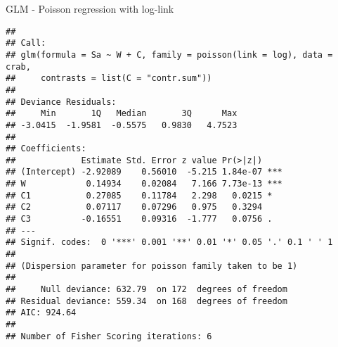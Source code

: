 \documentclass[ignorenonframetext,]{beamer}
\newenvironment{Shaded}{\begin{snugshade}}{\end{snugshade}}
\newcommand{\KeywordTok}[1]{\textcolor[rgb]{0.13,0.29,0.53}{\textbf{#1}}}
\newcommand{\DataTypeTok}[1]{\textcolor[rgb]{0.13,0.29,0.53}{#1}}
\newcommand{\DecValTok}[1]{\textcolor[rgb]{0.00,0.00,0.81}{#1}}
\newcommand{\StringTok}[1]{\textcolor[rgb]{0.31,0.60,0.02}{#1}}
\newcommand{\CommentTok}[1]{\textcolor[rgb]{0.56,0.35,0.01}{\textit{#1}}}
\newcommand{\OperatorTok}[1]{\textcolor[rgb]{0.81,0.36,0.00}{\textbf{#1}}}
\newcommand{\NormalTok}[1]{#1}
\begin{document}
\begin{frame}[fragile]

\begin{block}{GLM - Poisson regression with log-link}

\begin{Shaded}
\end{Shaded}

\begin{verbatim}
## 
## Call:
## glm(formula = Sa ~ W + C, family = poisson(link = log), data = crab, 
##     contrasts = list(C = "contr.sum"))
## 
## Deviance Residuals: 
##     Min       1Q   Median       3Q      Max  
## -3.0415  -1.9581  -0.5575   0.9830   4.7523  
## 
## Coefficients:
##             Estimate Std. Error z value Pr(>|z|)    
## (Intercept) -2.92089    0.56010  -5.215 1.84e-07 ***
## W            0.14934    0.02084   7.166 7.73e-13 ***
## C1           0.27085    0.11784   2.298   0.0215 *  
## C2           0.07117    0.07296   0.975   0.3294    
## C3          -0.16551    0.09316  -1.777   0.0756 .  
## ---
## Signif. codes:  0 '***' 0.001 '**' 0.01 '*' 0.05 '.' 0.1 ' ' 1
## 
## (Dispersion parameter for poisson family taken to be 1)
## 
##     Null deviance: 632.79  on 172  degrees of freedom
## Residual deviance: 559.34  on 168  degrees of freedom
## AIC: 924.64
## 
## Number of Fisher Scoring iterations: 6
\end{verbatim}

\end{block}

\end{frame}
\end{document}
